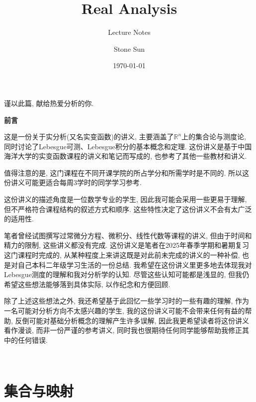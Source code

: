 \documentclass[theorem=false,mathfont=none,openany,sub3section]{easybook}
\title{Real Analysis}
\subtitle{Lecture Notes}
\author{Stone Sun}
\date{\today}
\renewcommand{\rmdefault}{lmr}
\newcommand{\btocgroup}[1][toc]{\addtocontents{#1}{\string\begingroup}}
\newcommand{\etocgroup}[1][toc]{\addtocontents{#1}{\string\endgroup}}
\begin{document}
\maketitle
\begin{center}
谨以此篇, 献给热爱分析的你.\par
\end{center}
\frontmatter

\begingroup
\renewcommand{\familydefault}{\rmdefault}
\tableofcontents
\endgroup

\newpage
\begin{center}
\Large
\textbf{前言}\par
\end{center}

\hspace{2em}

这是一份关于实分析(又名实变函数)的讲义, 主要涵盖了$\mathbb{R}^n$上的集合论与测度论, 同时讨论了Lebesgue可测、Lebesgue积分的基本概念和定理. 这份讲义是基于中国海洋大学的实变函数课程的讲义和笔记而写成的, 也参考了其他一些教材和讲义.\par
值得注意的是, 这门课程在不同开课学院的所占学分和所需学时是不同的. 所以这份讲义可能更适合每周3学时的同学学习参考.\par
这份讲义的描述角度是一位数学专业的学生, 因此我可能会采用一些更易于理解, 但不严格符合课程结构的叙述方式和顺序. 这些特性决定了这份讲义不会有太广泛的适用性.\par
笔者曾经试图撰写过常微分方程、微积分、线性代数等课程的讲义, 但由于时间和精力的限制, 这些讲义都没有完成. 这份讲义是笔者在2025年春季学期和暑期复习这门课程时完成的, 从某种程度上来讲这既是对此前未完成的讲义的一种补偿, 也是对自己本科二年级学习生活的一份总结. 我希望在这份讲义里更多地去体现我对Lebesgue测度的理解和我对分析学的认知. 尽管这些认知可能都是浅显的, 但我仍希望这些想法能够落到具体实际, 以作纪念和方便回顾.\par
除了上述这些想法之外, 我还希望基于此回忆一些学习时的一些有趣的理解, 作为一名可能对分析方向不太感兴趣的学生, 我的这份讲义可能不会带来任何有益的帮助, 反倒可能对基础分析概念的理解产生许多误解, 因此我更希望读者将这份讲义看作漫谈, 而非一份严谨的参考讲义, 同时我也很期待任何同学能够帮助我修正其中的任何错误.\par
\begin{flushright}
\\
\text{\today}
\end{flushright}

\mainmatter

\btocgroup
{}
\chapter{集合与映射}
\etocgroup
\end{document}
